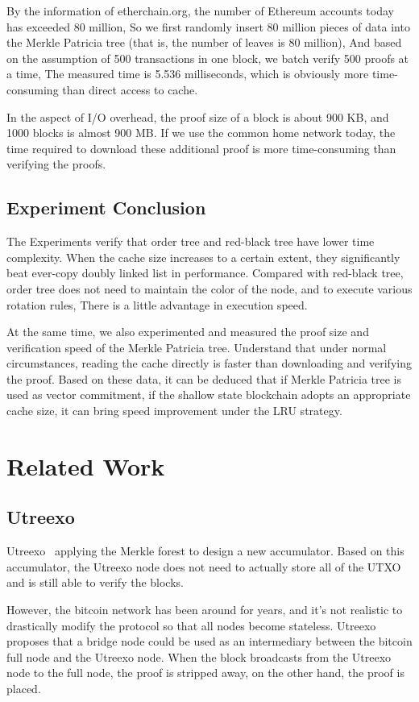 \documentclass[conference]{IEEEtran}
\begin{document}
By the information of etherchain.org,
the number of Ethereum accounts today has exceeded 80 million,
So we first randomly insert 80 million pieces
of data into the Merkle Patricia
tree (that is, the number of leaves is 80 million),
And based on the assumption of 500 transactions in
one block, we batch verify 500 proofs at a time,
The measured time is 5.536 milliseconds, which is
obviously more time-consuming than direct access to cache.

In the aspect of I/O overhead, the proof size of a
block is about 900 KB, and 1000 blocks is almost 900 MB.
If we use the common home network today,
the time required to download these additional
proof is more time-consuming than verifying the proofs.

\subsection{Experiment Conclusion}

The Experiments verify that order tree and red-black tree
have lower time complexity. When the cache size increases
to a certain extent, they significantly beat ever-copy
doubly linked list in performance. Compared with
red-black tree, order tree does not need to maintain
the color of the node, and to execute various rotation rules,
There is a little advantage in execution speed.

At the same time, we also experimented and measured
the proof size and verification speed of the Merkle
Patricia tree. Understand that under normal circumstances,
reading the cache directly is faster than downloading
and verifying the proof. Based on these data,
it can be deduced that if Merkle Patricia tree
is used as vector commitment, if the shallow state
blockchain adopts an appropriate cache size, it
can bring speed improvement under the LRU strategy.

\section{Related Work}
\subsection{Utreexo}
Utreexo~\cite{b1} applying the Merkle forest to  design a new accumulator.
Based on this accumulator, the Utreexo node does not need to actually store all of the UTXO and is still able to verify the blocks.

However, the bitcoin network has been around for years, and it's not realistic to drastically modify the protocol so that all nodes become stateless.
Utreexo proposes that a bridge node could be used as an intermediary between the bitcoin full node and the Utreexo node.
When the block broadcasts from the Utreexo node to the full node, the proof is stripped away, on the other hand, the proof is placed.
\end{document}
